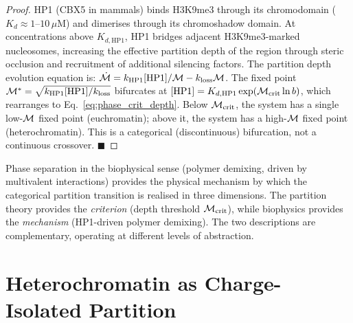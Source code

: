 \begin{proof}
HP1 (CBX5 in mammals) binds H3K9me3 through its chromodomain
($K_d \approx 1$--$10\,\mu$M) and dimerises through its chromoshadow domain.
At concentrations above $K_{d,\mathrm{HP1}}$, HP1 bridges adjacent
H3K9me3-marked nucleosomes, increasing the effective partition depth of the
region through steric occlusion and recruitment of additional silencing factors.
The partition depth evolution equation is:
$\dot{\mathcal{M}} = k_{\mathrm{HP1}}[\mathrm{HP1}]/\mathcal{M} - k_{\mathrm{loss}}\mathcal{M}$.
The fixed point $\mathcal{M}^* = \sqrt{k_{\mathrm{HP1}}[\mathrm{HP1}]/k_{\mathrm{loss}}}$
bifurcates at $[\mathrm{HP1}] = K_{d,\mathrm{HP1}} \exp(\mathcal{M}_{\mathrm{crit}}\ln b)$,
which rearranges to Eq.~\eqref{eq:phase_crit_depth}. Below $\mathcal{M}_{\mathrm{crit}}$,
the system has a single low-$\mathcal{M}$ fixed point (euchromatin); above it,
the system has a high-$\mathcal{M}$ fixed point (heterochromatin). This is a
categorical (discontinuous) bifurcation, not a continuous crossover. $\blacksquare$
\end{proof}

\begin{remark}
Phase separation in the biophysical sense (polymer demixing, driven by
multivalent interactions) provides the physical mechanism by which the
categorical partition transition is realised in three dimensions. The partition
theory provides the \emph{criterion} (depth threshold $\mathcal{M}_{\mathrm{crit}}$),
while biophysics provides the \emph{mechanism} (HP1-driven polymer demixing).
The two descriptions are complementary, operating at different levels of
abstraction.
\end{remark}

\section{Heterochromatin as Charge-Isolated Partition}
\label{sec:heterochromatin_partition}

